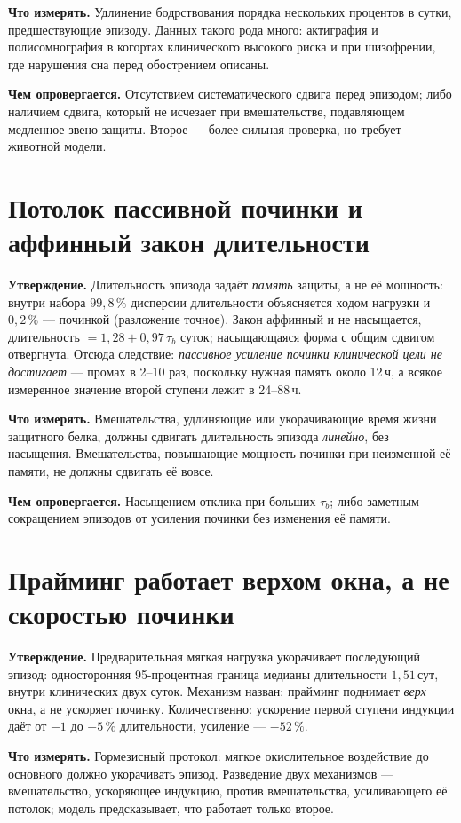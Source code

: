 \documentclass[11pt,a4paper]{article}
\begin{document}
\textbf{Что измерять.} Удлинение бодрствования порядка нескольких процентов в сутки,
предшествующие эпизоду. Данных такого рода много: актиграфия и полисомнография в когортах
клинического высокого риска и при шизофрении, где нарушения сна перед обострением описаны.

\textbf{Чем опровергается.} Отсутствием систематического сдвига перед эпизодом; либо наличием
сдвига, который не исчезает при вмешательстве, подавляющем медленное звено защиты. Второе --- более
сильная проверка, но требует животной модели.

\section{Потолок пассивной починки и аффинный закон длительности}
\textbf{Утверждение.} Длительность эпизода задаёт \emph{память} защиты, а не её мощность: внутри
набора $99{,}8\,\%$ дисперсии длительности объясняется ходом нагрузки и $0{,}2\,\%$ --- починкой
(разложение точное). Закон аффинный и не насыщается, длительность $=1{,}28+0{,}97\,\tau_b$ суток;
насыщающаяся форма с общим сдвигом отвергнута. Отсюда следствие: \emph{пассивное усиление починки
клинической цели не достигает} --- промах в 2--10 раз, поскольку нужная память около 12\,ч, а всякое
измеренное значение второй ступени лежит в 24--88\,ч.

\textbf{Что измерять.} Вмешательства, удлиняющие или укорачивающие время жизни защитного белка,
должны сдвигать длительность эпизода \emph{линейно}, без насыщения. Вмешательства, повышающие
мощность починки при неизменной её памяти, не должны сдвигать её вовсе.

\textbf{Чем опровергается.} Насыщением отклика при больших $\tau_b$; либо заметным сокращением
эпизодов от усиления починки без изменения её памяти.

\section{Прайминг работает верхом окна, а не скоростью починки}
\textbf{Утверждение.} Предварительная мягкая нагрузка укорачивает последующий эпизод: односторонняя
95-процентная граница медианы длительности $1{,}51$\,сут, внутри клинических двух суток. Механизм
назван: прайминг поднимает \emph{верх} окна, а не ускоряет починку. Количественно: ускорение первой
ступени индукции даёт от $-1$ до $-5\,\%$ длительности, усиление --- $-52\,\%$.

\textbf{Что измерять.} Гормезисный протокол: мягкое окислительное воздействие до основного должно
укорачивать эпизод. Разведение двух механизмов --- вмешательство, ускоряющее индукцию, против
вмешательства, усиливающего её потолок; модель предсказывает, что работает только второе.
\end{document}
